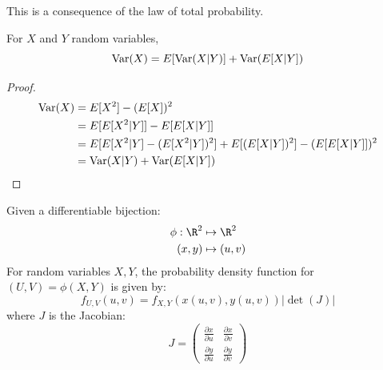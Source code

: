 \documentclass[../Main.tex]{subfiles}
\begin{document}
This is a consequence of the law of total probability.
\begin{proposition}
    For $X$ and $Y$ random variables,
    \begin{equation*}
        \operatorname{Var}(X) = E[\operatorname{Var}(X | Y)] + \operatorname{Var}(E[X | Y])
    \end{equation*}
    \label{propTotalVar}
\end{proposition}
\begin{proof}
    \begin{align*}
        \operatorname{Var}(X) &= E[X^2] - (E[X])^2 \\
        &= E[E[X^2 | Y]] - E[E[X | Y]] \\
        &= E[E[X^2|Y] - (E[X^2 | Y])^2] + E[(E[X | Y])^2] - (E[E[X | Y]])^2 \\
        &= \operatorname{Var}(X | Y) + \operatorname{Var}(E[X | Y])
    \end{align*}
\end{proof}
\begin{proposition}
    Given a differentiable bijection:
    \begin{align*}
        \phi : \R^2 &\mapsto \R^2\\
        (x, y) &\mapsto (u, v)
    \end{align*}
    For random variables $X, Y$, the probability density function for $(U, V) = \phi(X, Y)$ is given by:
    \begin{equation*}
        f_{U, V}(u, v) = f_{X, Y}(x(u, v), y(u, v)) |\det(J)|
    \end{equation*}
    where $J$ is the Jacobian:
    \begin{equation*}
        J = 
        \begin{pmatrix}
            \frac{\partial x}{\partial u} & \frac{\partial x}{\partial v} \\
            \frac{\partial y}{\partial u} & \frac{\partial y}{\partial v}
        \end{pmatrix}
    \end{equation*}
    \label{propChangeVars}
\end{proposition}
\end{document}
